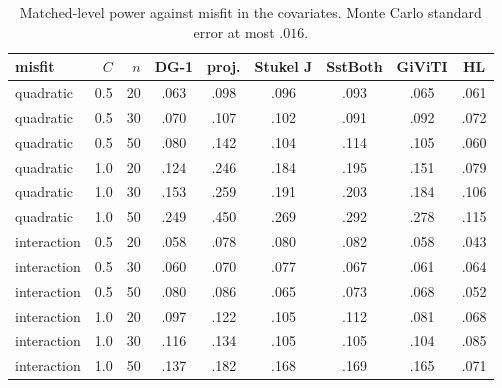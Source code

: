 \begin{table}[h]
\centering
\caption{Matched-level power against misfit in the covariates. Monte Carlo standard error at most $.016$.}
\label{tab:smalln_power}
\small
\begin{tabular}{@{}lrrcccccc@{}}
\toprule
misfit & $C$ & $n$ & DG-1 & proj. & Stukel J & SstBoth & GiViTI & HL \\
\midrule
quadratic & 0.5 & 20 & .063 & .098 & .096 & .093 & .065 & .061 \\
quadratic & 0.5 & 30 & .070 & .107 & .102 & .091 & .092 & .072 \\
quadratic & 0.5 & 50 & .080 & .142 & .104 & .114 & .105 & .060 \\
quadratic & 1.0 & 20 & .124 & .246 & .184 & .195 & .151 & .079 \\
quadratic & 1.0 & 30 & .153 & .259 & .191 & .203 & .184 & .106 \\
quadratic & 1.0 & 50 & .249 & .450 & .269 & .292 & .278 & .115 \\
interaction & 0.5 & 20 & .058 & .078 & .080 & .082 & .058 & .043 \\
interaction & 0.5 & 30 & .060 & .070 & .077 & .067 & .061 & .064 \\
interaction & 0.5 & 50 & .080 & .086 & .065 & .073 & .068 & .052 \\
interaction & 1.0 & 20 & .097 & .122 & .105 & .112 & .081 & .068 \\
interaction & 1.0 & 30 & .116 & .134 & .105 & .105 & .104 & .085 \\
interaction & 1.0 & 50 & .137 & .182 & .168 & .169 & .165 & .071 \\
\bottomrule
\end{tabular}
\end{table}

